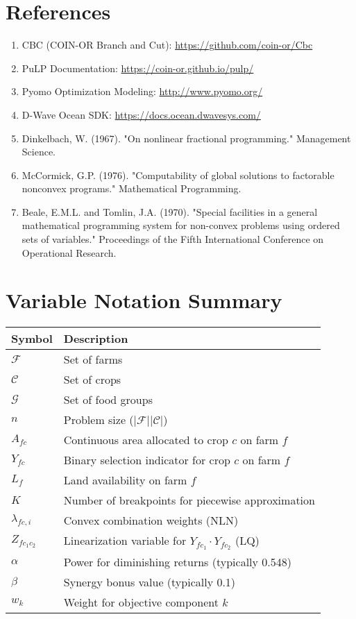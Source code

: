 \documentclass[11pt,a4paper]{article}
\begin{document}
\section{References}

\begin{enumerate}
    \item CBC (COIN-OR Branch and Cut): \url{https://github.com/coin-or/Cbc}
    \item PuLP Documentation: \url{https://coin-or.github.io/pulp/}
    \item Pyomo Optimization Modeling: \url{http://www.pyomo.org/}
    \item D-Wave Ocean SDK: \url{https://docs.ocean.dwavesys.com/}
    \item Dinkelbach, W. (1967). "On nonlinear fractional programming." Management Science.
    \item McCormick, G.P. (1976). "Computability of global solutions to factorable nonconvex programs." Mathematical Programming.
    \item Beale, E.M.L. and Tomlin, J.A. (1970). "Special facilities in a general mathematical programming system for non-convex problems using ordered sets of variables." Proceedings of the Fifth International Conference on Operational Research.
\end{enumerate}

\appendix

\section{Variable Notation Summary}

\begin{table}[h]
\centering
\begin{tabular}{ll}
\toprule
\textbf{Symbol} & \textbf{Description} \\
\midrule
$\mathcal{F}$ & Set of farms \\
$\mathcal{C}$ & Set of crops \\
$\mathcal{G}$ & Set of food groups \\
$n$ & Problem size ($|\mathcal{F}||\mathcal{C}|$) \\
$A_{fc}$ & Continuous area allocated to crop $c$ on farm $f$ \\
$Y_{fc}$ & Binary selection indicator for crop $c$ on farm $f$ \\
$L_f$ & Land availability on farm $f$ \\
$K$ & Number of breakpoints for piecewise approximation \\
$\lambda_{fc,i}$ & Convex combination weights (NLN) \\
$Z_{fc_1c_2}$ & Linearization variable for $Y_{fc_1} \cdot Y_{fc_2}$ (LQ) \\
$\alpha$ & Power for diminishing returns (typically 0.548) \\
$\beta$ & Synergy bonus value (typically 0.1) \\
$w_k$ & Weight for objective component $k$ \\
\bottomrule
\end{tabular}
\end{table}
\end{document}
